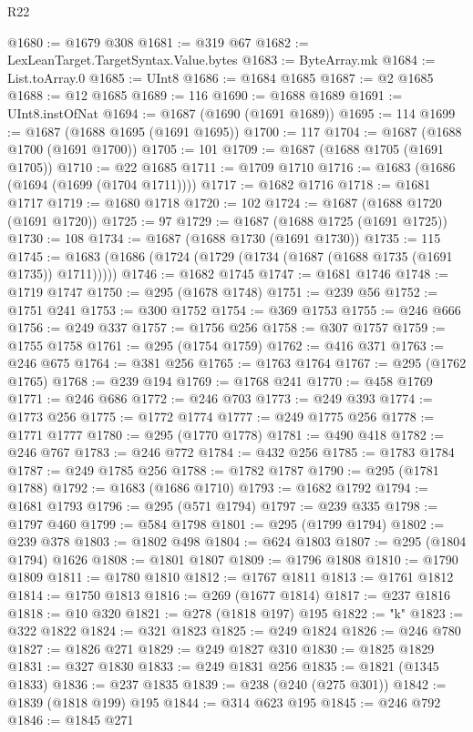 \begin{lexlean}{R22}
\begin{coremodule}
@1680 := @1679 @308
@1681 := @319 @67
@1682 := LexLeanTarget.TargetSyntax.Value.bytes
@1683 := ByteArray.mk
@1684 := List.toArray.{0}
@1685 := UInt8
@1686 := @1684 @1685
@1687 := @2 @1685
@1688 := @12 @1685
@1689 := 116
@1690 := @1688 @1689
@1691 := UInt8.instOfNat
@1694 := @1687 (@1690 (@1691 @1689))
@1695 := 114
@1699 := @1687 (@1688 @1695 (@1691 @1695))
@1700 := 117
@1704 := @1687 (@1688 @1700 (@1691 @1700))
@1705 := 101
@1709 := @1687 (@1688 @1705 (@1691 @1705))
@1710 := @22 @1685
@1711 := @1709 @1710
@1716 := @1683 (@1686 (@1694 (@1699 (@1704 @1711))))
@1717 := @1682 @1716
@1718 := @1681 @1717
@1719 := @1680 @1718
@1720 := 102
@1724 := @1687 (@1688 @1720 (@1691 @1720))
@1725 := 97
@1729 := @1687 (@1688 @1725 (@1691 @1725))
@1730 := 108
@1734 := @1687 (@1688 @1730 (@1691 @1730))
@1735 := 115
@1745 := @1683 (@1686 (@1724 (@1729 (@1734 (@1687 (@1688 @1735 (@1691 @1735)) @1711)))))
@1746 := @1682 @1745
@1747 := @1681 @1746
@1748 := @1719 @1747
@1750 := @295 (@1678 @1748)
@1751 := @239 @56
@1752 := @1751 @241
@1753 := @300 @1752
@1754 := @369 @1753
@1755 := @246 @666
@1756 := @249 @337
@1757 := @1756 @256
@1758 := @307 @1757
@1759 := @1755 @1758
@1761 := @295 (@1754 @1759)
@1762 := @416 @371
@1763 := @246 @675
@1764 := @381 @256
@1765 := @1763 @1764
@1767 := @295 (@1762 @1765)
@1768 := @239 @194
@1769 := @1768 @241
@1770 := @458 @1769
@1771 := @246 @686
@1772 := @246 @703
@1773 := @249 @393
@1774 := @1773 @256
@1775 := @1772 @1774
@1777 := @249 @1775 @256
@1778 := @1771 @1777
@1780 := @295 (@1770 @1778)
@1781 := @490 @418
@1782 := @246 @767
@1783 := @246 @772
@1784 := @432 @256
@1785 := @1783 @1784
@1787 := @249 @1785 @256
@1788 := @1782 @1787
@1790 := @295 (@1781 @1788)
@1792 := @1683 (@1686 @1710)
@1793 := @1682 @1792
@1794 := @1681 @1793
@1796 := @295 (@571 @1794)
@1797 := @239 @335
@1798 := @1797 @460
@1799 := @584 @1798
@1801 := @295 (@1799 @1794)
@1802 := @239 @378
@1803 := @1802 @498
@1804 := @624 @1803
@1807 := @295 (@1804 @1794) @1626
@1808 := @1801 @1807
@1809 := @1796 @1808
@1810 := @1790 @1809
@1811 := @1780 @1810
@1812 := @1767 @1811
@1813 := @1761 @1812
@1814 := @1750 @1813
@1816 := @269 (@1677 @1814)
@1817 := @237 @1816
@1818 := @10 @320
@1821 := @278 (@1818 @197) @195
@1822 := "k"
@1823 := @322 @1822
@1824 := @321 @1823
@1825 := @249 @1824
@1826 := @246 @780
@1827 := @1826 @271
@1829 := @249 @1827 @310
@1830 := @1825 @1829
@1831 := @327 @1830
@1833 := @249 @1831 @256
@1835 := @1821 (@1345 @1833)
@1836 := @237 @1835
@1839 := @238 (@240 (@275 @301))
@1842 := @1839 (@1818 @199) @195
@1844 := @314 @623 @195
@1845 := @246 @792
@1846 := @1845 @271

\end{coremodule}
\end{lexlean}
